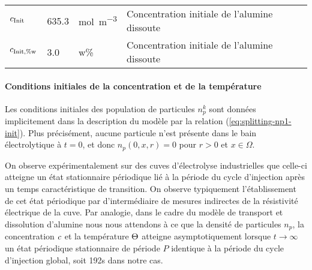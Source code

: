 \begin{table}
\begin{center}
\begin{tabularx}{\textwidth}{@{}lllX@{}}
      $c_\text{Init}$                         & \num{635.3}      & \si{\mol\per\cubic\meter}                   & Concentration initiale de l'alumine dissoute                    \\
      $c_{\text{Init},\%\mathrm w}$                       & \num{3.0}        & w\%                                         & Concentration initiale de l'alumine dissoute                    \\
      \bottomrule
    \end{tabularx}
  \end{center}
\end{table}

\paragraph{Conditions initiales de la concentration et de la
  température}
Les conditions initiales des population de particules $n_p^k$ sont
données implicitement dans la description du modèle par la
relation (\ref{eq:splitting-np1-init}). Plus précisément, aucune
particule n'est présente dans le bain électrolytique à $t = 0$, et
donc $n_p(0, x,r) = 0$ pour $r>0$ et $x\in\Omega$.

On observe expérimentalement sur des cuves d'électrolyse industrielles
que celle-ci atteigne un état stationnaire périodique lié à la période
du cycle d'injection après un temps caractéristique de transition. On
observe typiquement l'établissement de cet état périodique par
d'intermédiaire de mesures indirectes de la résistivité électrique de
la cuve. Par analogie, dans le cadre du modèle de transport et
dissolution d'alumine nous nous attendons à ce que la densité de
particules $n_p$, la concentration $c$ et la température
$\Theta$ atteigne asymptotiquement lorsque $t\to\infty$ un état
périodique stationnaire de période $P$ identique à la période du
cycle d'injection global, soit \num{192}\si{\second} dans notre cas.

